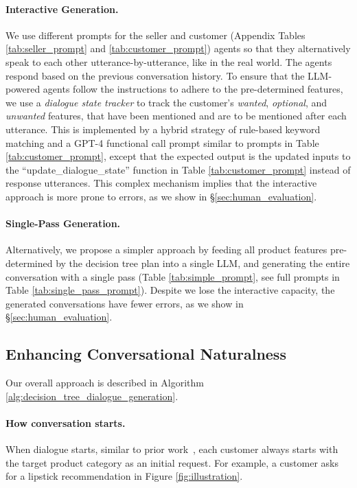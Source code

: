 \paragraph{Interactive Generation.}
\label{sec:IG}
We use different prompts for the seller and customer (Appendix Tables \ref{tab:seller_prompt} and \ref{tab:customer_prompt}) agents so that they alternatively speak to each other utterance-by-utterance, like in the real world. %
The agents respond based on the previous conversation history. To ensure that the LLM-powered agents follow the instructions to adhere to the pre-determined features, we use a \textit{dialogue state tracker} \cite{young2010hidden} to track the customer's \textit{wanted}, \textit{optional}, and \textit{unwanted} features, that have been mentioned and are to be mentioned after each utterance. This is implemented by a hybrid strategy of rule-based keyword matching and a GPT-4 functional call prompt similar to prompts in Table \ref{tab:customer_prompt}, except that the expected output is the updated inputs to the ``update\_dialogue\_state'' function in Table \ref{tab:customer_prompt} instead of response utterances. This complex mechanism implies that the interactive approach is more prone to errors, as we show in \S\ref{sec:human_evaluation}.


\vspace{-0.5em}
\paragraph{Single-Pass Generation.}
\label{sec:SG}
Alternatively, we propose a simpler approach by feeding all product features pre-determined by the decision tree plan into a single LLM, and generating the entire conversation with a single pass (Table \ref{tab:simple_prompt}, see full prompts in Table \ref{tab:single_pass_prompt}). Despite we lose the interactive capacity, the generated conversations have fewer errors, as we show in \S\ref{sec:human_evaluation}.

\subsection{Enhancing Conversational Naturalness}
Our overall approach is described in Algorithm \ref{alg:decision_tree_dialogue_generation}.
\vspace{-0.5em}
\paragraph{How conversation starts.}
When dialogue starts, similar to prior work~\cite{zhang2018towards,bi2019conversational,zou2022learning}, each customer always starts with the target product category as an initial request. For example, a customer asks for a lipstick recommendation in Figure \ref{fig:illustration}. 

